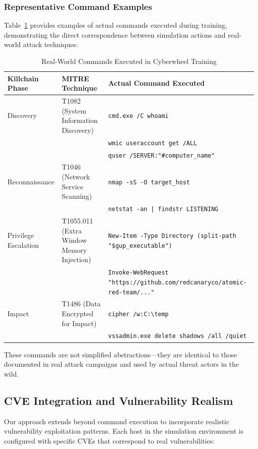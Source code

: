 \subsubsection{Representative Command Examples}

Table~\ref{tab:art_commands} provides examples of actual commands executed during training, demonstrating the direct correspondence between simulation actions and real-world attack techniques:

\begin{table}[H]
\centering
\caption{Real-World Commands Executed in Cyberwheel Training}
\label{tab:art_commands}
\begin{tabular}{p{3cm}p{4cm}p{7cm}}
\toprule
\textbf{Killchain Phase} & \textbf{MITRE Technique} & \textbf{Actual Command Executed} \\
\midrule
Discovery & T1082 (System Information Discovery) & \texttt{cmd.exe /C whoami} \\
 & & \texttt{wmic useraccount get /ALL} \\
 & & \texttt{quser /SERVER:"\#{computer\_name}"} \\
\midrule
Reconnaissance & T1046 (Network Service Scanning) & \texttt{nmap -sS -O target\_host} \\
 & & \texttt{netstat -an | findstr LISTENING} \\
\midrule
Privilege Escalation & T1055.011 (Extra Window Memory Injection) & \texttt{New-Item -Type Directory (split-path "\${gup\_executable}")} \\
 & & \texttt{Invoke-WebRequest "https://github.com/redcanaryco/atomic-red-team/..."} \\
\midrule
Impact & T1486 (Data Encrypted for Impact) & \texttt{cipher /w:C:\textbackslash temp} \\
 & & \texttt{vssadmin.exe delete shadows /all /quiet} \\
\bottomrule
\end{tabular}
\end{table}

These commands are not simplified abstractions—they are identical to those documented in real attack campaigns and used by actual threat actors in the wild.

\subsection{CVE Integration and Vulnerability Realism}

Our approach extends beyond command execution to incorporate realistic vulnerability exploitation patterns. Each host in the simulation environment is configured with specific CVEs that correspond to real vulnerabilities:

